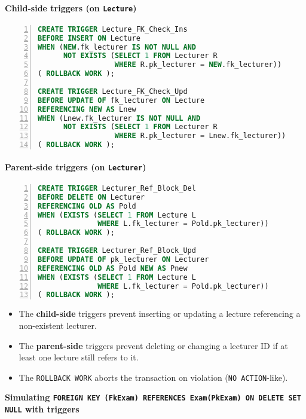 \documentclass{article}
\begin{document}
\begin{subtasks}
\begin{enumerate}[label=(\roman*)]
\paragraph{Child-side triggers (on \texttt{Lecture})}
\begin{lstlisting}[language=SQL,frame=single,numbers=left,numberstyle=\tiny]
CREATE TRIGGER Lecture_FK_Check_Ins 
BEFORE INSERT ON Lecture 
WHEN (NEW.fk_lecturer IS NOT NULL AND
      NOT EXISTS (SELECT 1 FROM Lecturer R 
                  WHERE R.pk_lecturer = NEW.fk_lecturer))
( ROLLBACK WORK );

CREATE TRIGGER Lecture_FK_Check_Upd 
BEFORE UPDATE OF fk_lecturer ON Lecture
REFERENCING NEW AS Lnew
WHEN (Lnew.fk_lecturer IS NOT NULL AND 
      NOT EXISTS (SELECT 1 FROM Lecturer R
                  WHERE R.pk_lecturer = Lnew.fk_lecturer))
( ROLLBACK WORK );
\end{lstlisting}

\paragraph{Parent-side triggers (on \texttt{Lecturer})}
\begin{lstlisting}[language=SQL,frame=single,numbers=left,numberstyle=\tiny]
CREATE TRIGGER Lecturer_Ref_Block_Del
BEFORE DELETE ON Lecturer
REFERENCING OLD AS Pold
WHEN (EXISTS (SELECT 1 FROM Lecture L
              WHERE L.fk_lecturer = Pold.pk_lecturer))
( ROLLBACK WORK );

CREATE TRIGGER Lecturer_Ref_Block_Upd
BEFORE UPDATE OF pk_lecturer ON Lecturer
REFERENCING OLD AS Pold NEW AS Pnew
WHEN (EXISTS (SELECT 1 FROM Lecture L
              WHERE L.fk_lecturer = Pold.pk_lecturer))
( ROLLBACK WORK );
\end{lstlisting}

\begin{itemize}
  \item The \textbf{child-side} triggers prevent inserting or updating a lecture referencing a non-existent lecturer.
  \item The \textbf{parent-side} triggers prevent deleting or changing a lecturer ID if at least one lecture still refers to it.
  \item The \texttt{ROLLBACK WORK} aborts the transaction on violation (\texttt{NO ACTION}-like).
\end{itemize}
\end{enumerate} %

\item %
\textbf{Simulating \texttt{FOREIGN KEY (FkExam) REFERENCES Exam(PkExam) ON DELETE SET NULL} with triggers}


\end{subtasks}
\end{document}
